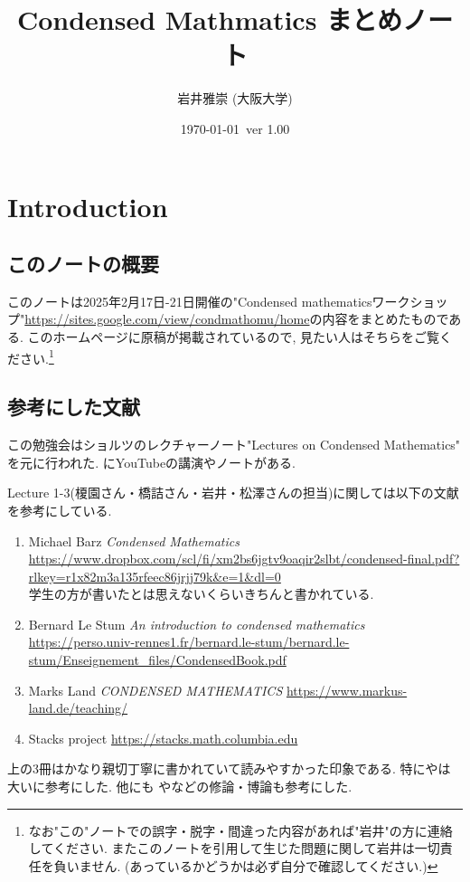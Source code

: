 \documentclass[dvipdfmx,a4paper,11pt]{report}
\title{Condensed Mathmatics まとめノート}
\author{岩井雅崇 (大阪大学)}
\date{\today \, ver 1.00}
\theoremstyle{definition}
\begin{document}
\maketitle
\tableofcontents

\newpage

\setcounter{chapter}{-1}
\chapter{Introduction}

\section{このノートの概要}
このノートは2025年2月17日-21日開催の"Condensed mathematicsワークショップ"\url{https://sites.google.com/view/condmathomu/home}の内容をまとめたものである. 
このホームページに原稿が掲載されているので, 見たい人はそちらをご覧ください.\footnote{なお"この"ノートでの誤字・脱字・間違った内容があれば"岩井"の方に連絡してください. またこのノートを引用して生じた問題に関して岩井は一切責任を負いません. (あっているかどうかは必ず自分で確認してください.)}


\section{参考にした文献}
この勉強会はショルツのレクチャーノート"Lectures on Condensed Mathematics"\cite{Sch19}
を元に行われた. \cite{SchClau}にYouTubeの講演やノートがある.

Lecture 1-3(榎園さん・橋詰さん・岩井・松澤さんの担当)に関しては以下の文献を参考にしている. 
\begin{enumerate}
\item \cite{Bar22}
Michael Barz \textit{Condensed Mathematics} \\
\url{https://www.dropbox.com/scl/fi/xm2bs6jgtv9oaqir2slbt/condensed-final.pdf?rlkey=r1x82m3a135rfeec86jrjj79k&e=1&dl=0} \\
学生の方が書いたとは思えないくらいきちんと書かれている.
\item \cite{Stum} Bernard Le Stum
\textit{An introduction to condensed mathematics}
\url{https://perso.univ-rennes1.fr/bernard.le-stum/bernard.le-stum/Enseignement_files/CondensedBook.pdf} 
\item \cite{Land} Marks Land \textit{CONDENSED MATHEMATICS}
\url{https://www.markus-land.de/teaching/}
\item \cite{Sta} Stacks project \url{https://stacks.math.columbia.edu}
\end{enumerate}
上の3冊はかなり親切丁寧に書かれていて読みやすかった印象である. 特に\cite{Stum}や\cite{Bar22}は大いに参考にした. 他にも\cite{Asg} や\cite{Lep}などの修論・博論も参考にした. 
\end{document}

